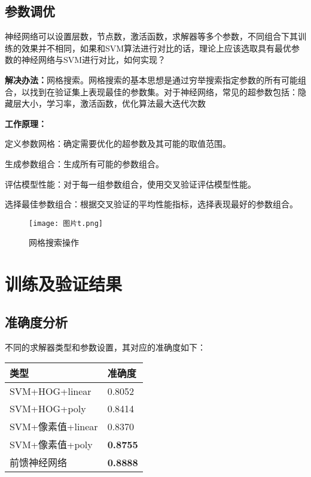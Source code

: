 \documentclass[10.5pt,compsoc,UTF8]{CjC}
\theoremstyle{mystyle}
\begin{document}
\subsection{参数调优}
神经网络可以设置层数，节点数，激活函数，求解器等多个参数，不同组合下其训练的效果并不相同，如果和SVM算法进行对比的话，理论上应该选取具有最优参数的神经网络与SVM进行对比，如何实现？

\textbf{解决办法：}网格搜索。网格搜索的基本思想是通过穷举搜索指定参数的所有可能组合，以找到在验证集上表现最佳的参数集。对于神经网络，常见的超参数包括：隐藏层大小，学习率，激活函数，优化算法最大迭代次数

\textbf{工作原理：}

定义参数网格：确定需要优化的超参数及其可能的取值范围。

生成参数组合：生成所有可能的参数组合。

评估模型性能：对于每一组参数组合，使用交叉验证评估模型性能。

选择最佳参数组合：根据交叉验证的平均性能指标，选择表现最好的参数组合。
\begin{figure}[h] %
    \centering %
    \texttt{[image: 图片t.png]} %
    \caption{网格搜索操作} %
\end{figure}

\section{\heiti 训练及验证结果}

\subsection{准确度分析}
不同的求解器类型和参数设置，其对应的准确度如下：
\begin{table}[htbp]
\vspace {-2.5mm}
\begin{center}
\begin{tabular}{l     l}
\toprule
类型&准确度 \\
\hline
SVM+HOG+linear&0.8052
 \\
SVM+HOG+poly&0.8414
 \\
SVM+像素值+linear&0.8370
 \\
SVM+像素值+poly&\textbf{0.8755}
 \\
 前馈神经网络&\textbf{0.8888}
 \\
\bottomrule
\end{tabular}
\label{tab1}
\end{center}
\end{table}
\end{document}
